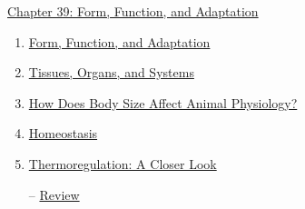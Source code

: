 \documentclass[12pt,letterpaper]{article}
\newcommand{\thetitle}{\hypertarget{home}{Animals and Ecology}}
\begin{document}



\clearpage

\renewcommand{\thetitle}{\hypertarget{39}{Form, Function, and Adaptation}}
\hypertarget{39}{} 

\begin{chapbox}{\hyperlink{home}{Chapter 39: Form, Function, and Adaptation}}
    \begin{enumerate}
        \item \hyperlink{39.1}{Form, Function, and Adaptation}
        \item \hyperlink{39.2}{Tissues, Organs, and Systems}
        \item \hyperlink{39.3}{How Does Body Size Affect Animal Physiology?}
        \item \hyperlink{39.4}{Homeostasis}
        \item \hyperlink{39.5}{Thermoregulation: A Closer Look}
        \item [--] \hyperlink{39.r}{Review}
    \end{enumerate}
\end{chapbox}
\end{document}
